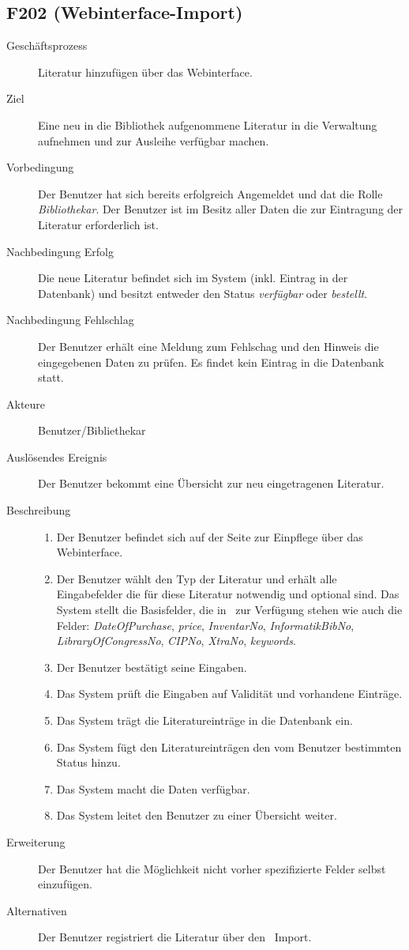 \subsection{F202 (Webinterface-Import)}
\begin{description}
  \item[Geschäftsprozess]Literatur hinzufügen über das Webinterface.
  \item[Ziel]Eine neu in die Bibliothek aufgenommene Literatur in die Verwaltung aufnehmen und zur Ausleihe verfügbar machen.
  \item[Vorbedingung]Der Benutzer hat sich bereits erfolgreich Angemeldet und dat die Rolle \emph{Bibliothekar}. Der Benutzer ist im Besitz aller Daten die zur Eintragung der Literatur erforderlich ist.
  \item[Nachbedingung Erfolg]Die neue Literatur befindet sich im System (inkl. Eintrag in der Datenbank) und besitzt entweder den Status \emph{verfügbar} oder \emph{bestellt}.
  \item[Nachbedingung Fehlschlag]Der Benutzer erhält eine Meldung zum Fehlschag und den Hinweis die eingegebenen Daten zu prüfen. Es findet kein Eintrag in die Datenbank statt.
  \item[Akteure]Benutzer/Bibliethekar
  \item[Auslösendes Ereignis]Der Benutzer bekommt eine Übersicht zur neu eingetragenen Literatur.
  \item[Beschreibung]
    \begin{enumerate}
      \item Der Benutzer befindet sich auf der Seite zur Einpflege über das Webinterface.
      \item Der Benutzer wählt den Typ der Literatur und erhält alle Eingabefelder die für diese Literatur notwendig und optional sind. Das System stellt die Basisfelder, die in \BibTeX\ zur Verfügung stehen wie auch die Felder: \emph{DateOfPurchase}, \emph{price}, \emph{InventarNo}, \emph{InformatikBibNo}, \emph{LibraryOfCongressNo}, \emph{CIPNo}, \emph{XtraNo}, \emph{keywords}.
      \item Der Benutzer bestätigt seine Eingaben.
      \item Das System prüft die Eingaben auf Validität und vorhandene Einträge.
      \item Das System trägt die Literatureinträge in die Datenbank ein.
      \item Das System fügt den Literatureinträgen den vom Benutzer bestimmten Status hinzu.
      \item Das System macht die Daten verfügbar.
      \item Das System leitet den Benutzer zu einer Übersicht weiter.
    \end{enumerate}
  \item[Erweiterung]Der Benutzer hat die Möglichkeit nicht vorher spezifizierte Felder selbst einzufügen.
  \item[Alternativen]Der Benutzer registriert die Literatur über den \BibTeX\ Import.
\end{description}

